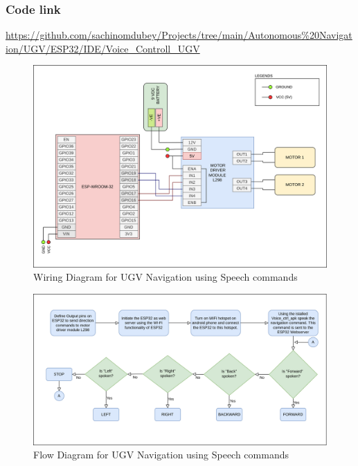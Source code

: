 \subsubsection{Code link} \label{Code_link_UGV_speech}
\begin{tcolorbox}
\url{https://github.com/sachinomdubey/Projects/tree/main/Autonomous\%20Navigation/UGV/ESP32/IDE/Voice_Controll_UGV}
\end{tcolorbox}

\begin{figure}[h!]
\centering
\includegraphics[width=\columnwidth]{./Figures/Wiring_UGV_speech.png}
\caption{Wiring Diagram for UGV Navigation using Speech commands}
\label{Wiring_UGV_speech}
\end{figure}

\begin{figure}[h!]
\centering
\includegraphics[width=\columnwidth]{./Figures/Flow_UGV_speech.png}
\caption{Flow Diagram for UGV Navigation using Speech commands}
\label{Flow_UGV_speech}
\end{figure}

